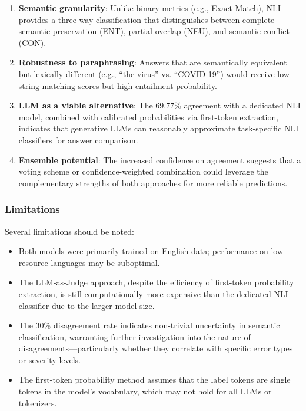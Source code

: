     \begin{enumerate}
        \item \textbf{Semantic granularity}: Unlike binary metrics (e.g., Exact Match), NLI provides a three-way classification that distinguishes between complete semantic preservation (ENT), partial overlap (NEU), and semantic conflict (CON).
        
        \item \textbf{Robustness to paraphrasing}: Answers that are semantically equivalent but lexically different (e.g., ``the virus'' vs. ``COVID-19'') would receive low string-matching scores but high entailment probability.
        
        \item \textbf{LLM as a viable alternative}: The 69.77\% agreement with a dedicated NLI model, combined with calibrated probabilities via first-token extraction, indicates that generative LLMs can reasonably approximate task-specific NLI classifiers for answer comparison.
        
        \item \textbf{Ensemble potential}: The increased confidence on agreement suggests that a voting scheme or confidence-weighted combination could leverage the complementary strengths of both approaches for more reliable predictions.
    \end{enumerate}

    \subsubsection{Limitations}

    Several limitations should be noted:

    \begin{itemize}
        \item Both models were primarily trained on English data; performance on low-resource languages may be suboptimal.
        \item The LLM-as-Judge approach, despite the efficiency of first-token probability extraction, is still computationally more expensive than the dedicated NLI classifier due to the larger model size.
        \item The 30\% disagreement rate indicates non-trivial uncertainty in semantic classification, warranting further investigation into the nature of disagreements---particularly whether they correlate with specific error types or severity levels.
        \item The first-token probability method assumes that the label tokens are single tokens in the model's vocabulary, which may not hold for all LLMs or tokenizers.
    \end{itemize}
